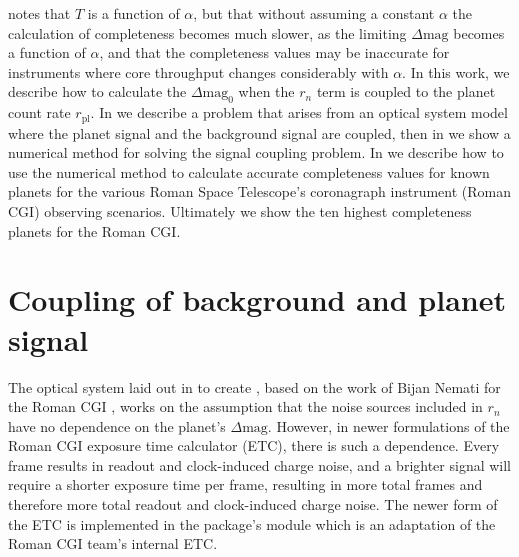 \citet{keithlyOptimalScheduling2020} notes that $T$ is a function of $\alpha$,
but that without assuming a constant $\alpha$ the calculation of completeness
becomes much slower, as the limiting $\Delta\textrm{mag}$ becomes a function of
$\alpha$, and that the completeness values may be inaccurate for instruments
where core throughput changes considerably with $\alpha$. In this work, we
describe how to calculate the $\Delta\textrm{mag}_0$ when the
$r_{n}$ term is coupled to the planet count rate $r_{\textrm{pl}}$.
In  we describe a problem
that arises from an optical system model where the planet signal and the
background signal are coupled, then in  we
show a numerical method for solving the signal coupling problem. In
 we describe how to use the numerical method to
calculate accurate completeness values for known planets for the various Roman
Space Telescope's coronagraph instrument (Roman CGI) observing scenarios.
Ultimately we show the ten highest completeness planets for the Roman CGI.

\section{Coupling of background and planet signal} %
\label{sec:Coupling of background and planet signal}

The optical system laid out in \citet{keithlyOptimalScheduling2020} to create
, based on the work of Bijan Nemati for the Roman CGI
\citep{Nemati2014, nematiSensitivityWFIRST2017, Nemati2020a}, works on the
assumption that the noise sources included in $r_{n}$ have no dependence on the
planet's $\Delta\textrm{mag}$. However, in newer formulations of the Roman CGI
exposure time calculator (ETC), there is such a dependence. Every frame results
in readout and clock-induced charge noise, and a brighter signal will require a
shorter exposure time per frame, resulting in more total frames and therefore
more total readout and clock-induced charge noise. The newer form of the ETC is
implemented in the 
\citep{savranskyWFIRSTAFTACoronagraphScience2015} package's 
module which is an adaptation of the Roman CGI team's internal ETC.

